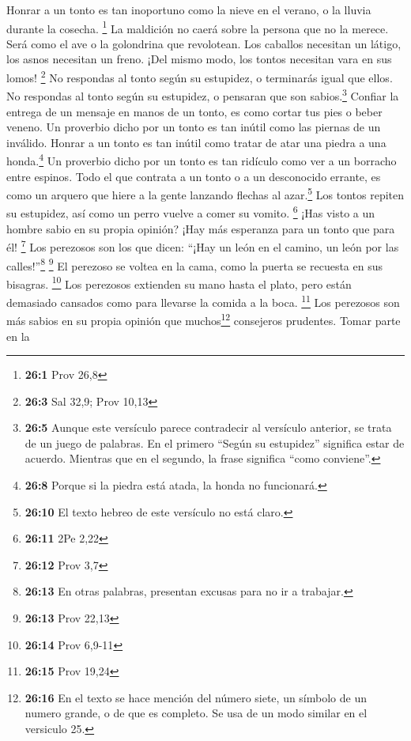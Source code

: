  Honrar a un tonto es tan inoportuno como la nieve en el
verano, o la lluvia durante la cosecha. \footnote{\textbf{26:1} Prov
  26,8}  La maldición no caerá sobre la persona que no la
merece. Será como el ave o la golondrina que revolotean. 
Los caballos necesitan un látigo, los asnos necesitan un freno. ¡Del
mismo modo, los tontos necesitan vara en sus lomos! \footnote{\textbf{26:3}
  Sal 32,9; Prov 10,13}  No respondas al tonto según su
estupidez, o terminarás igual que ellos.  No respondas al
tonto según su estupidez, o pensaran que son sabios.\footnote{\textbf{26:5}
  Aunque este versículo parece contradecir al versículo anterior, se
  trata de un juego de palabras. En el primero ``Según su estupidez''
  significa estar de acuerdo. Mientras que en el segundo, la frase
  significa ``como conviene''.}  Confiar la entrega de un
mensaje en manos de un tonto, es como cortar tus pies o beber veneno.
 Un proverbio dicho por un tonto es tan inútil como las
piernas de un inválido.  Honrar a un tonto es tan inútil
como tratar de atar una piedra a una honda.\footnote{\textbf{26:8}
  Porque si la piedra está atada, la honda no funcionará.}
 Un proverbio dicho por un tonto es tan ridículo como ver
a un borracho entre espinos.  Todo el que contrata a un
tonto o a un desconocido errante, es como un arquero que hiere a la
gente lanzando flechas al azar.\footnote{\textbf{26:10} El texto hebreo
  de este versículo no está claro.}  Los tontos repiten
su estupidez, así como un perro vuelve a comer su vomito. \footnote{\textbf{26:11}
  2Pe 2,22}  ¡Has visto a un hombre sabio en su propia
opinión? ¡Hay más esperanza para un tonto que para él! \footnote{\textbf{26:12}
  Prov 3,7}  Los perezosos son los que dicen: ``¡Hay un
león en el camino, un león por las calles!''\footnote{\textbf{26:13} En
  otras palabras, presentan excusas para no ir a trabajar.} \footnote{\textbf{26:13}
  Prov 22,13}  El perezoso se voltea en la cama, como la
puerta se recuesta en sus bisagras. \footnote{\textbf{26:14} Prov 6,9-11}
 Los perezosos extienden su mano hasta el plato, pero
están demasiado cansados como para llevarse la comida a la boca.
\footnote{\textbf{26:15} Prov 19,24}  Los perezosos son
más sabios en su propia opinión que muchos\footnote{\textbf{26:16} En el
  texto se hace mención del número siete, un símbolo de un numero
  grande, o de que es completo. Se usa de un modo similar en el
  versiculo 25.} consejeros prudentes.  Tomar parte en la
